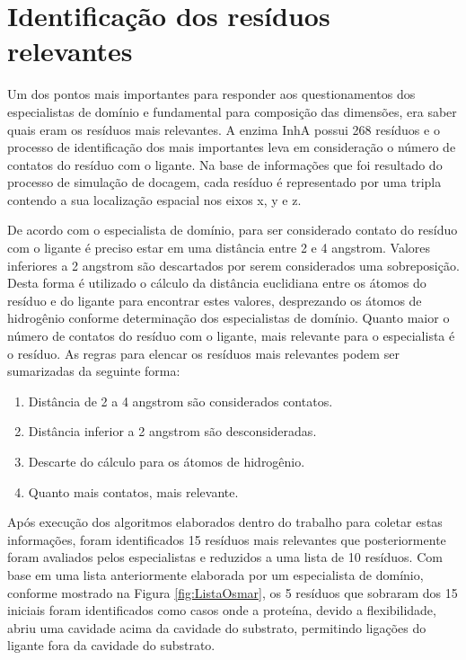 \section{Identificação dos resíduos relevantes}
Um dos pontos mais importantes para responder aos questionamentos dos especialistas de domínio e fundamental para composição das dimensões, era saber quais eram os resíduos mais relevantes. A enzima InhA possui 268 resíduos \cite{KARANADUNOSM09} e o processo de identificação dos mais importantes leva em consideração o número de contatos do resíduo com o ligante. Na base de informações que foi resultado do processo de simulação de docagem, cada resíduo é representado por uma tripla contendo a sua localização espacial nos eixos x, y e z.

De acordo com o especialista de domínio, para ser considerado contato do resíduo com o ligante é preciso estar em uma distância entre 2 e 4 angstrom. Valores inferiores a 2 angstrom são descartados por serem considerados uma sobreposição. Desta forma é utilizado o cálculo da distância euclidiana entre os átomos do resíduo e do ligante \cite{KARANADUNOSM09} para encontrar estes valores, desprezando os átomos de hidrogênio conforme determinação dos especialistas de domínio. Quanto maior o número de contatos do resíduo com o ligante, mais relevante para o especialista é o resíduo. As regras para elencar os resíduos mais relevantes podem ser sumarizadas da seguinte forma:

\begin{enumerate}
    \item Distância de 2 a 4 angstrom são considerados contatos.
    \item Distância inferior a 2 angstrom são desconsideradas. 
    \item Descarte do cálculo para os átomos de hidrogênio.
    \item Quanto mais contatos, mais relevante.
\end{enumerate}

Após execução dos algoritmos elaborados dentro do trabalho para coletar estas informações, foram identificados 15 resíduos mais relevantes que posteriormente foram avaliados pelos especialistas e reduzidos a uma lista de 10 resíduos. Com base em uma lista anteriormente elaborada por um especialista de domínio, conforme mostrado na Figura \ref{fig:ListaOsmar}, os 5 resíduos que sobraram dos 15 iniciais foram identificados como casos onde a proteína, devido a flexibilidade, abriu uma cavidade acima da cavidade do substrato, permitindo ligações do ligante fora da cavidade do substrato.

